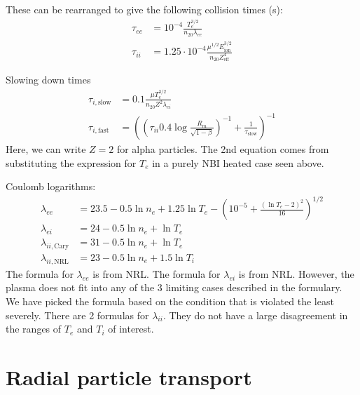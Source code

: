 These can be rearranged to give the following collision times (s): 
\begin{align}
    \tau_{ee} &= 10^{-4} \frac{T_e^{3/2}}{n_{20} \lambda_{ee}} \\
    \tau_{ii} &= 1.25\cdot10^{-4} \frac{\mu^{1/2} E_{\text{ion}}^{3/2}}{n_{20}Z_{\text{eff}}^4}
\end{align}

Slowing down times \cite{dolan_1982} 
\begin{align}
    \tau_{i,\text{slow}} &= 0.1 \frac{\mu T_e^{3/2}}{n_{20} Z^2 \lambda_{ei}} \\
    \tau_{i,\text{fast}} &= \left( \left( \tau_{ii} 0.4 \log{\frac{R_m}{\sqrt{1-\beta}}} \right)^{-1} + \frac{1}{\tau_{\text{slow}}} \right)^{-1}
\end{align}
Here, we can write $Z=2$ for alpha particles. The 2nd equation comes from substituting the expression for $T_e$ in a purely NBI heated case seen above.

Coulomb logarithms:
\begin{align}
    \lambda_{ee} &= 23.5 - 0.5\ln{n_e} + 1.25\ln{T_{e}} - \left( 10^{-5} + \frac{\left( \ln{T_{e}} - 2 \right)^2}{16} \right)^{1/2} \\
    \lambda_{ei} &= 24 - 0.5\ln{n_e} + \ln{T_e} \\
    \lambda_{ii, \text{Cary}} &= 31 - 0.5 \ln{n_e} + \ln{T_e} \\
    \lambda_{ii, \text{NRL}} &= 23 - 0.5 \ln{n_e} + 1.5 \ln{T_i}
\end{align}
The formula for $\lambda_{ee}$ is from NRL. 
The formula for $\lambda_{ei}$ is from NRL. However, the plasma does not fit into any of the 3 limiting cases described in the formulary. We have picked the formula based on the condition that is violated the least severely. 
There are 2 formulas for $\lambda_{ii}$. They do not have a large disagreement in the ranges of $T_e$ and $T_i$ of interest.

\section{Radial particle transport}

